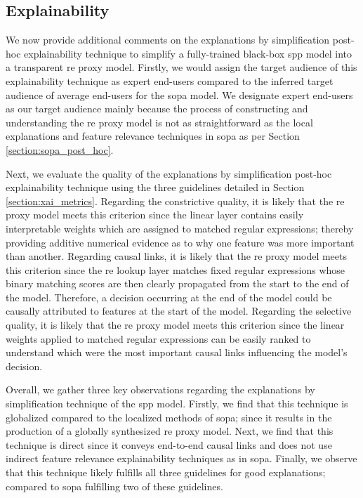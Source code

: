 \subsection{Explainability}

We now provide additional comments on the explanations by simplification
post-hoc explainability technique to simplify a fully-trained black-box \ac{spp}
model into a transparent \ac{re} proxy model. Firstly, we would assign the target
audience of this explainability technique as expert end-users compared to the
inferred target audience of average end-users for the \ac{sopa} model. We designate
expert end-users as our target audience mainly because the process of constructing
and understanding the \ac{re} proxy model is not as straightforward as the local
explanations and feature relevance techniques in \ac{sopa} as per Section
\ref{section:sopa_post_hoc}.

Next, we evaluate the quality of the explanations by simplification post-hoc
explainability technique using the three guidelines detailed in Section
\ref{section:xai_metrics}. Regarding the constrictive quality, it is likely that
the \ac{re} proxy model meets this criterion since the linear layer contains
easily interpretable weights which are assigned to matched regular expressions;
thereby providing additive numerical evidence as to why one feature was more
important than another. Regarding causal links, it is likely that the \ac{re}
proxy model meets this criterion since the \ac{re} lookup layer matches fixed
regular expressions whose binary matching scores are then clearly propagated
from the start to the end of the model. Therefore, a decision occurring at the
end of the model could be causally attributed to features at the start of the
model. Regarding the selective quality, it is likely that the \ac{re} proxy
model meets this criterion since the linear weights applied to matched regular
expressions can be easily ranked to understand which were the most important
causal links influencing the model's decision.

Overall, we gather three key observations regarding the explanations by
simplification technique of the \ac{spp} model. Firstly, we find that this
technique is globalized compared to the localized methods of \ac{sopa}; since it
results in the production of a globally synthesized \ac{re} proxy model. Next,
we find that this technique is direct since it conveys end-to-end causal links
and does not use indirect feature relevance explainability techniques as in
\ac{sopa}. Finally, we observe that this technique likely fulfills all three
guidelines for good explanations; compared to \ac{sopa} fulfilling two of these
guidelines.


